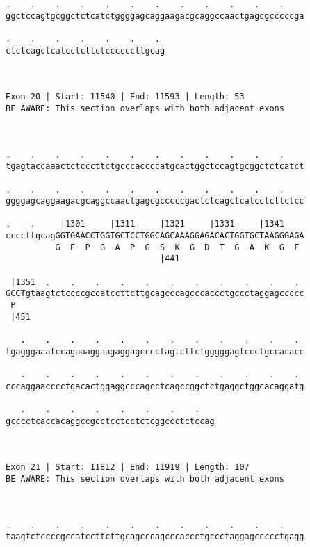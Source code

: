 \documentclass{article}
\begin{document}
\begin{Verbatim}
.    .    .    .    .    .    .    .    .    .    .    .    
ggctccagtgcggctctcatctggggagcaggaagacgcaggccaactgagcgcccccga
                                                            
.    .    .    .    .    .    . 
ctctcagctcatcctcttctccccccttgcag
                                
                                
 
Exon 20 | Start: 11540 | End: 11593 | Length: 53
BE AWARE: This section overlaps with both adjacent exons



.    .    .    .    .    .    .    .    .    .    .    .    
tgagtaccaaactctcccttctgcccaccccatgcactggctccagtgcggctctcatct
                                                            
.    .    .    .    .    .    .    .    .    .    .    .    
ggggagcaggaagacgcaggccaactgagcgcccccgactctcagctcatcctcttctcc
                                                            
.    .     |1301     |1311     |1321     |1331     |1341    
ccccttgcagGGTGAACCTGGTGCTCCTGGCAGCAAAGGAGACACTGGTGCTAAGGGAGA
          G  E  P  G  A  P  G  S  K  G  D  T  G  A  K  G  E 
                               |441                         
  
 |1351  .    .    .    .    .    .    .    .    .    .    . 
GCCTgtaagtctccccgccatccttcttgcagcccagcccaccctgccctaggagccccc
 P                                                          
 |451                                                       
  
   .    .    .    .    .    .    .    .    .    .    .    . 
tgagggaaatccagaaaggaagaggagcccctagtcttctgggggagtccctgccacacc
                                                            
   .    .    .    .    .    .    .    .    .    .    .    . 
cccaggaacccctgacactggaggcccagcctcagccggctctgaggctggcacaggatg
                                                            
   .    .    .    .    .    .    .    .   
gcccctcaccacaggccgcctcctcctctcggccctctccag
                                          
                                          
 
Exon 21 | Start: 11812 | End: 11919 | Length: 107
BE AWARE: This section overlaps with both adjacent exons



.    .    .    .    .    .    .    .    .    .    .    .    
taagtctccccgccatccttcttgcagcccagcccaccctgccctaggagccccctgagg
                                                            

\end{Verbatim}
\end{document}
